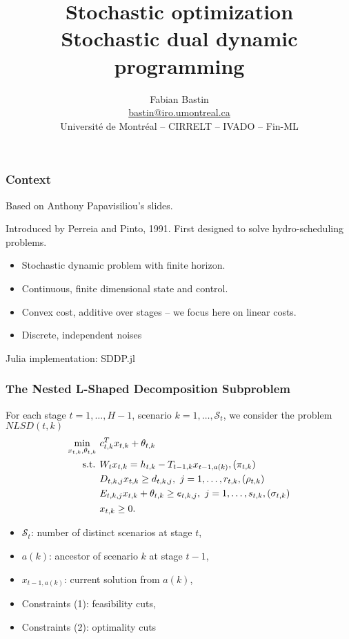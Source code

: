 \documentclass{beamer}
\title[SA vs SAA]{Stochastic optimization\\Stochastic dual dynamic programming}
\author[Fabian Bastin]{Fabian Bastin \\ \url{bastin@iro.umontreal.ca} \\ Université de Montréal -- CIRRELT -- IVADO -- Fin-ML}
\date{}
\def\KK{\mathcal{K}}
\def\KK{\mathcal{S}}
\begin{document}
\frame{\titlepage}

\begin{frame}
\frametitle{Context}

Based on Anthony Papavisiliou's slides.

\mbox{}

Introduced by Perreia and Pinto, 1991.
First designed to solve hydro-scheduling problems.

\mbox{}

\begin{itemize}
\item
Stochastic dynamic problem with finite horizon.
\item
Continuous, finite dimensional state and control.
\item
Convex cost, additive over stages -- we focus here on linear costs.
\item
Discrete, independent noises
\end{itemize}

\mbox{}

Julia implementation: SDDP.jl

\end{frame}

\begin{frame}
\frametitle{The Nested L-Shaped Decomposition Subproblem}

For each stage $t = 1,\ldots, H-1$, scenario $k = 1,\ldots,\KK_t$, we consider the problem $NLSD(t,k)$
\begin{align}
\min_{x_{t,k}, \theta_{t,k}}\ & c_{t,k}^T x_{t,k} + \theta_{t,k} \notag \\
\mbox{s.t. } &
W_t x_{t,k} = h_{t,k} - T_{t-1,k} x_{t-1,a(k)}, (\pi_{t,k})  \notag \\
& D_{t,k,j}x_{t,k} \geq d_{t,k,j},\ j = 1,\ldots,r_{t,k}, (\rho_{t,k}) \\
& E_{t,k,j}x_{t,k} + \theta_{t,k} \geq e_{t,k,j},\ j = 1,\ldots, s_{t,k}, (\sigma_{t,k}) \\
&
\begin{aligned}
 x_{t,k} \geq 0.  \notag
\end{aligned}
\end{align}
\begin{itemize}
\item
$\KK_t$: number of distinct scenarios at stage $t$,
\item
$a(k)$: ancestor of scenario $k$ at stage $t - 1$,
\item
$x_{t-1,a(k)}$: current solution from $a(k)$,
\item
Constraints (1): feasibility cuts,
\item
Constraints (2): optimality cuts
\end{itemize}

\end{frame}
\end{document}
